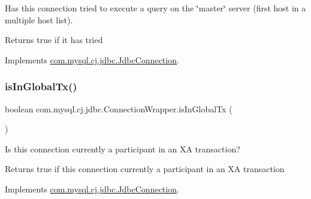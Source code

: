 Has this connection tried to execute a query on the \char`\"{}master\char`\"{} server (first host in a multiple host list).

\begin{DoxyReturn}{Returns}
true if it has tried 
\end{DoxyReturn}


Implements \mbox{\hyperlink{interfacecom_1_1mysql_1_1cj_1_1jdbc_1_1_jdbc_connection_ab7d858b77e30de81f7ec67504ba89b0c}{com.\+mysql.\+cj.\+jdbc.\+Jdbc\+Connection}}.

\mbox{\label{classcom_1_1mysql_1_1cj_1_1jdbc_1_1_connection_wrapper_a939c7730de2849e54b9b121adb1cdaa3}} 
\subsubsection{\texorpdfstring{is\+In\+Global\+Tx()}{isInGlobalTx()}}
{\footnotesize\ttfamily boolean com.\+mysql.\+cj.\+jdbc.\+Connection\+Wrapper.\+is\+In\+Global\+Tx (\begin{DoxyParamCaption}{ }\end{DoxyParamCaption})}

Is this connection currently a participant in an XA transaction?

\begin{DoxyReturn}{Returns}
true if this connection currently a participant in an XA transaction 
\end{DoxyReturn}


Implements \mbox{\hyperlink{interfacecom_1_1mysql_1_1cj_1_1jdbc_1_1_jdbc_connection_a919152df37a4bf60c12c0818256a90a3}{com.\+mysql.\+cj.\+jdbc.\+Jdbc\+Connection}}.

\mbox{\label{classcom_1_1mysql_1_1cj_1_1jdbc_1_1_connection_wrapper_a7e344c8e7ee5db8d3e1a0aa96bd6e1fd}} 
